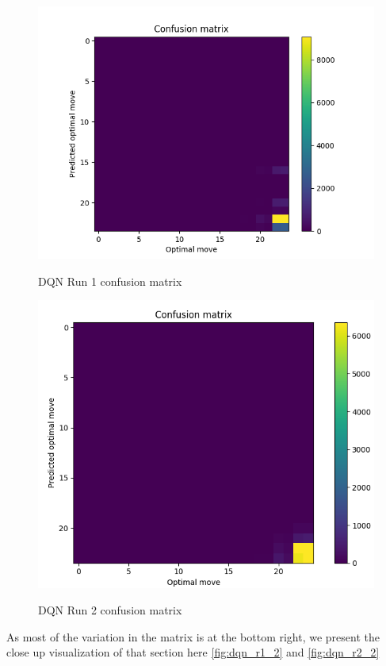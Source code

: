 \begin{figure}
\centering
\includegraphics[scale=1]{cm1.png}\\
\caption{DQN Run 1 confusion matrix}
\label{fig:dqn_r1_1}
\end{figure}

\begin{figure}
\centering
\includegraphics[scale=0.6]{cm3.png}\\
\caption{DQN Run 2 confusion matrix}
\label{fig:dqn_r2_1}
\end{figure}

As most of the variation in the matrix is at the bottom right, we present the close up visualization of that section here \ref{fig:dqn_r1_2} and \ref{fig:dqn_r2_2}

